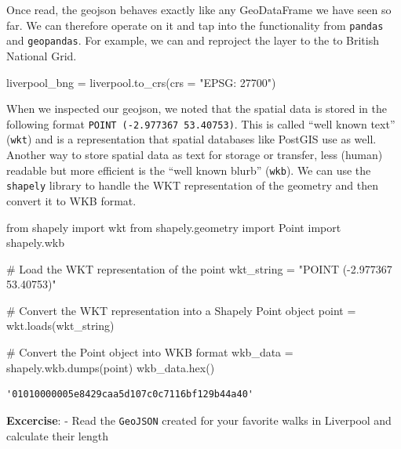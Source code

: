 \documentclass[
  letterpaper,
  DIV=11,
  numbers=noendperiod]{scrreprt}
\newenvironment{Shaded}{\begin{snugshade}}{\end{snugshade}}
\newcommand{\BuiltInTok}[1]{\textcolor[rgb]{0.00,0.23,0.31}{#1}}
\newcommand{\CommentTok}[1]{\textcolor[rgb]{0.37,0.37,0.37}{#1}}
\newcommand{\ImportTok}[1]{\textcolor[rgb]{0.00,0.46,0.62}{#1}}
\newcommand{\NormalTok}[1]{\textcolor[rgb]{0.00,0.23,0.31}{#1}}
\newcommand{\OperatorTok}[1]{\textcolor[rgb]{0.37,0.37,0.37}{#1}}
\newcommand{\StringTok}[1]{\textcolor[rgb]{0.13,0.47,0.30}{#1}}
\begin{document}
Once read, the geojson behaves exactly like any GeoDataFrame we have
seen so far. We can therefore operate on it and tap into the
functionality from \texttt{pandas} and \texttt{geopandas}. For example,
we can and reproject the layer to the to British National Grid.

\begin{Shaded}
\begin{Highlighting}[]
\NormalTok{liverpool\_bng }\OperatorTok{=}\NormalTok{ liverpool.to\_crs(crs }\OperatorTok{=} \StringTok{"EPSG: 27700"}\NormalTok{)}
\end{Highlighting}
\end{Shaded}

When we inspected our geojson, we noted that the spatial data is stored
in the following format \texttt{POINT\ (-2.977367\ 53.40753)}. This is
called ``well known text'' (\texttt{wkt}) and is a representation that
spatial databases like PostGIS use as well. Another way to store spatial
data as text for storage or transfer, less (human) readable but more
efficient is the ``well known blurb'' (\texttt{wkb}). We can use the
\texttt{shapely} library to handle the WKT representation of the
geometry and then convert it to WKB format.

\begin{Shaded}
\begin{Highlighting}[]
\ImportTok{from}\NormalTok{ shapely }\ImportTok{import}\NormalTok{ wkt}
\ImportTok{from}\NormalTok{ shapely.geometry }\ImportTok{import}\NormalTok{ Point}
\ImportTok{import}\NormalTok{ shapely.wkb}

\CommentTok{\# Load the WKT representation of the point}
\NormalTok{wkt\_string }\OperatorTok{=} \StringTok{"POINT ({-}2.977367 53.40753)"}

\CommentTok{\# Convert the WKT representation into a Shapely Point object}
\NormalTok{point }\OperatorTok{=}\NormalTok{ wkt.loads(wkt\_string)}

\CommentTok{\# Convert the Point object into WKB format}
\NormalTok{wkb\_data }\OperatorTok{=}\NormalTok{ shapely.wkb.dumps(point)}
\NormalTok{wkb\_data.}\BuiltInTok{hex}\NormalTok{()}
\end{Highlighting}
\end{Shaded}

\begin{verbatim}
'01010000005e8429caa5d107c0c7116bf129b44a40'
\end{verbatim}

\textbf{Excercise}: - Read the \texttt{GeoJSON} created for your
favorite walks in Liverpool and calculate their length
\end{document}
